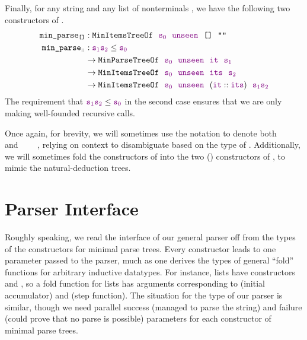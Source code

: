   Finally, for any string  and any list of nonterminals , we have the following two constructors of .
  \begin{align*}
    \fname{min\_parse$_\nil$} & \oftypesep \indname{MinItemsTreeOf}~~\farg{s$_0$}~~\farg{unseen}~~\nil~~\str{} \\
    \fname{min\_parse$_{\cons{}{}}$} & \oftypesep \strcat{\farg{s$_1$}}{\farg{s$_2$}} \le \farg{s$_0$} \\
    & \typeto \indname{MinParseTreeOf}~~\farg{s$_0$}~~\farg{unseen}~~\farg{it}~~\farg{s$_1$} \\
    & \typeto \indname{MinItemsTreeOf}~~\farg{s$_0$}~~\farg{unseen}~~\farg{its}~~\farg{s$_2$} \\
    & \typeto
    \indname{MinItemsTreeOf}~~\farg{s$_0$}~~\farg{unseen}~~(\cons{\farg{it}}{\farg{its}})~~\strcat{\farg{s$_1$}}{\farg{s$_2$}}
  \end{align*}
  The requirement that $\textcolor{violet}{\texttt{s$_1$}}\textcolor{violet}{\texttt{s$_2$}} \le \textcolor{violet}{\texttt{s$_0$}}$ in the second case ensures that we are only making well-founded recursive calls.

  Once again, for brevity, we will sometimes use the notation  to denote both ~~~~ and ~~~~, relying on context to disambiguate based on the type of .  Additionally, we will sometimes fold the constructors of  into the two () constructors of , to mimic the natural-deduction trees.

\section{Parser Interface} \label{sec:parser-interface}
  Roughly speaking, we read the interface of our general parser off from the types of the constructors for minimal parse trees.  Every constructor leads to one parameter passed to the parser, much as one derives the types of general ``fold'' functions for arbitrary inductive datatypes.  For instance, lists have constructors  and , so a fold function for lists has arguments corresponding to  (initial accumulator) and  (step function).  The situation for the type of our parser is similar, though we need parallel success (managed to parse the string) and failure (could prove that no parse is possible) parameters for each constructor of minimal parse trees.

